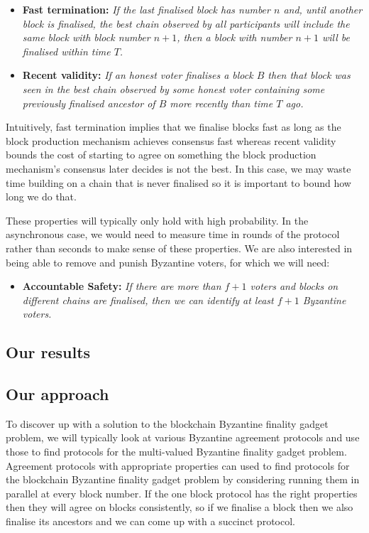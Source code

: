 \documentclass{article}
\begin{document}
\begin{itemize}
\item{\bf Fast termination:} {\em If the last finalised block has number $n$ and, until another block is finalised, the best chain observed by all participants will include the same block with block number $n+1$, then a block with number $n+1$ will be finalised within time $T$.}
\item{\bf Recent validity:} {\em If an honest voter finalises a block $B$ then that block was seen in the best chain observed by some honest voter containing some previously finalised ancestor of $B$ more recently than time $T$ ago.}
\end{itemize}

Intuitively, fast termination implies that we finalise blocks fast as long as the block production mechanism achieves consensus fast whereas recent validity bounds the cost of starting to agree on something the block production mechanism's consensus later decides is not the best. In this case, we may waste time building on a chain that is never finalised so it is important to bound how long we do that.

These properties will typically only hold with high probability. In the asynchronous case, we would need to measure time in rounds of the protocol rather than seconds to make sense of these properties.  We are also interested in being able to remove and punish Byzantine voters, for which we will need:

\begin{itemize}
	\item{\bf Accountable Safety:} {\em If there are more than $f+1$ voters and blocks on different chains are finalised, then we can identify at least $f+1$ Byzantine voters.}
\end{itemize}

\subsection{Our results}

\subsection{Our approach}

To discover up with a solution to the blockchain Byzantine finality gadget problem, we will typically look at various Byzantine agreement protocols and use those to find protocols for the multi-valued Byzantine finality gadget problem. 
Agreement protocols with appropriate properties can used to find protocols for the blockchain Byzantine finality gadget problem by considering running them in parallel at every block number.
If the one block protocol has the right properties then they will agree on blocks consistently, so if we finalise a block then we also finalise its ancestors and we can come up with a succinct protocol.
\end{document}
